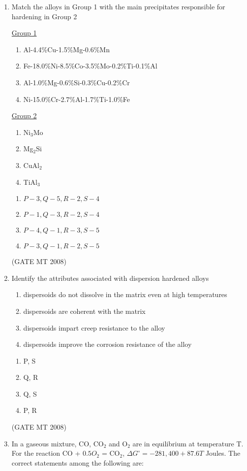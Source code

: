 \documentclass[journal, 11pt, onecolumn]{IEEEtran}
\theoremstyle{remark}
\begin{document}
\begin{enumerate}
\item Match the alloys in Group 1 with the main precipitates responsible for hardening in Group 2
\begin{multicols}{2}
\underline{Group 1}
\begin{enumerate}[label=(\Alph*), start=16]
\item Al-4.4\%Cu-1.5\%Mg-0.6\%Mn
\item Fe-18.0\%Ni-8.5\%Co-3.5\%Mo-0.2\%Ti-0.1\%Al
\item Al-1.0\%Mg-0.6\%Si-0.3\%Cu-0.2\%Cr
\item Ni-15.0\%Cr-2.7\%Al-1.7\%Ti-1.0\%Fe
\end{enumerate}

\underline{Group 2}
\begin{enumerate}[label=(\arabic*), start=1]
\item Ni$_3$Mo
\item Mg$_2$Si
\item CuAl$_2$ 
\item TiAl$_3$
\end{enumerate}
\end{multicols}

\begin{multicols}{2}
\begin{enumerate} 
\item $P-3, Q-5, R-2, S-4$
\item $P-1, Q-3, R-2, S-4$
\item $P-4, Q-1, R-3, S-5$
\item $P-3, Q-1, R-2, S-5$
\end{enumerate}
\end{multicols}

\hfill(GATE MT 2008)
\item Identify the attributes associated with dispersion hardened alloys
\begin{enumerate}[label=(\MakeUppercase{\alph*}), start= 16]
\item dispersoids do not dissolve in the matrix even at high temperatures
\item dispersoids are coherent with the matrix
\item dispersoids impart creep resistance to the alloy
\item dispersoids improve the corrosion resistance of the alloy
\end{enumerate}
\begin{multicols}{2}
\begin{enumerate} 
\item P, S
\item Q, R
\item Q, S
\item P, R
\end{enumerate}
\end{multicols}
\hfill(GATE MT 2008)
\item In a gaseous mixture, CO, CO$_2$ and O$_2$ are in equilibrium at temperature T. 
For the reaction CO + $0.5O$$_2$ = CO$_2$, 
$\Delta G^\circ = -281,400 + 87.6T$ Joules. 
The correct statements among the following are:


\end{enumerate}
\end{document}
